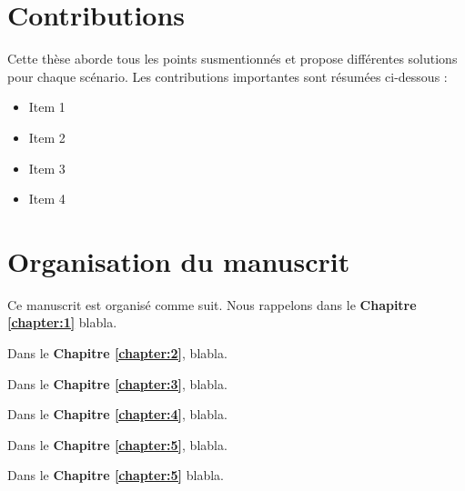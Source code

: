 \begin{resume_fr}
\section*{Contributions}

Cette thèse aborde tous les points susmentionnés et propose différentes solutions pour chaque scénario.
Les contributions importantes sont résumées ci-dessous :
\begin{itemize}
\item Item 1
\item Item 2
\item Item 3
\item Item 4
\end{itemize}

\section*{Organisation du manuscrit}

Ce manuscrit est organisé comme suit.
Nous rappelons dans le \textbf{Chapitre \ref{chapter:1}} blabla.

Dans le \textbf{Chapitre \ref{chapter:2}}, blabla.

Dans le \textbf{Chapitre \ref{chapter:3}}, blabla.

Dans le \textbf{Chapitre \ref{chapter:4}}, blabla.

Dans le \textbf{Chapitre \ref{chapter:5}}, blabla.

Dans le \textbf{Chapitre \ref{chapter:5}} blabla.

\end{resume_fr}
